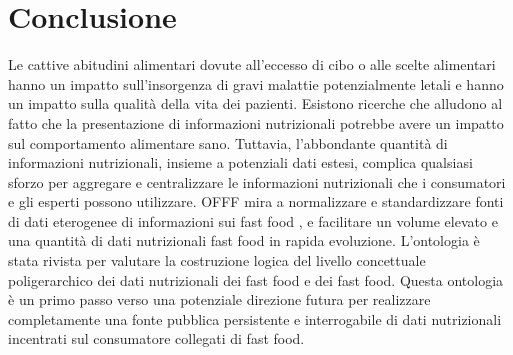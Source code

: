 \section{Conclusione}
Le cattive abitudini alimentari dovute all'eccesso di cibo o alle scelte alimentari hanno un impatto sull'insorgenza di gravi malattie potenzialmente letali e hanno un impatto sulla qualità della vita dei pazienti.
Esistono ricerche che alludono al fatto che la presentazione di informazioni nutrizionali potrebbe avere un impatto sul comportamento alimentare sano. Tuttavia, l'abbondante quantità di informazioni nutrizionali, insieme a potenziali dati estesi, complica qualsiasi sforzo per aggregare e centralizzare le informazioni nutrizionali che i consumatori e gli esperti possono utilizzare. 
OFFF mira a normalizzare e standardizzare fonti di dati eterogenee di informazioni sui fast food , e facilitare un volume elevato e una quantità di dati nutrizionali fast food in rapida evoluzione. 
L'ontologia è stata rivista per valutare la costruzione logica del livello concettuale poligerarchico dei dati nutrizionali dei fast food e dei fast food. 
Questa ontologia è un primo passo verso una potenziale direzione futura per realizzare completamente una fonte pubblica persistente e interrogabile di dati nutrizionali incentrati sul consumatore collegati di fast food.